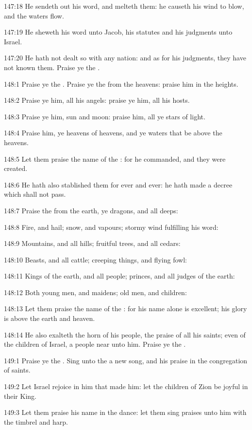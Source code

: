 147:18 He sendeth out his word, and melteth them: he causeth his wind to blow, and the waters flow.

147:19 He sheweth his word unto Jacob, his statutes and his judgments unto Israel.

147:20 He hath not dealt so with any nation: and as for his judgments, they have not known them. Praise ye the \LORD.



148:1 Praise ye the \LORD. Praise ye the \LORD from the heavens: praise him in the heights.

148:2 Praise ye him, all his angels: praise ye him, all his hosts.

148:3 Praise ye him, sun and moon: praise him, all ye stars of light.

148:4 Praise him, ye heavens of heavens, and ye waters that be above the heavens.

148:5 Let them praise the name of the \LORD: for he commanded, and they were created.

148:6 He hath also stablished them for ever and ever: he hath made a decree which shall not pass.

148:7 Praise the \LORD from the earth, ye dragons, and all deeps:

148:8 Fire, and hail; snow, and vapours; stormy wind fulfilling his word:

148:9 Mountains, and all hills; fruitful trees, and all cedars:

148:10 Beasts, and all cattle; creeping things, and flying fowl:

148:11 Kings of the earth, and all people; princes, and all judges of the earth:

148:12 Both young men, and maidens; old men, and children:

148:13 Let them praise the name of the \LORD: for his name alone is excellent; his glory is above the earth and heaven.

148:14 He also exalteth the horn of his people, the praise of all his saints; even of the children of Israel, a people near unto him. Praise ye the \LORD.



149:1 Praise ye the \LORD. Sing unto the \LORD a new song, and his praise in the congregation of saints.

149:2 Let Israel rejoice in him that made him: let the children of Zion be joyful in their King.

149:3 Let them praise his name in the dance: let them sing praises unto him with the timbrel and harp.

